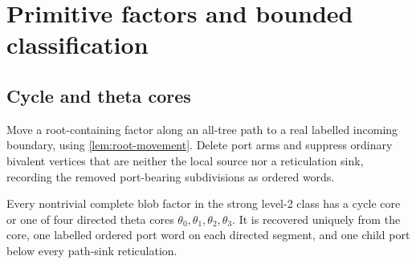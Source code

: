 \section{Primitive factors and bounded classification}\label{sec:bounded}

\subsection{Cycle and theta cores}

Move a root-containing factor along an all-tree path to a real labelled
incoming boundary, using \cref{lem:root-movement}.  Delete port arms and
suppress ordinary bivalent vertices that are neither the local source nor a
reticulation sink, recording the removed port-bearing subdivisions as
ordered words.

\begin{proposition}\label{prop:cores}
Every nontrivial complete blob factor in the strong level-2 class has a cycle
core or one of four directed theta cores
\(\theta_0,\theta_1,\theta_2,\theta_3\).  It is recovered uniquely from the
core, one labelled ordered port word on each directed segment, and one child
port below every path-sink reticulation.
\end{proposition}

